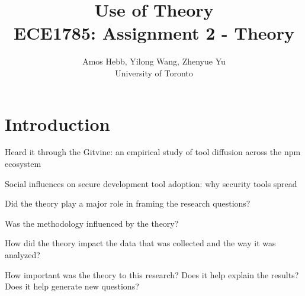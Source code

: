 \documentclass[12pt]{IEEEtran}
\begin{document}
\title{Use of Theory\\
{\normalsize ECE1785: Assignment 2 - Theory}}

\author{Amos Hebb, Yilong Wang, Zhenyue Yu\\ \small University of Toronto}

\maketitle

\section{Introduction}

Heard it through the {\sc Git}vine: an empirical study of tool diffusion across the npm ecosystem\cite{lamba2020heard}

Social influences on secure development tool adoption: why security tools spread\cite{xiao2014social}

Did the theory play a major role in framing the research questions?

Was the methodology influenced by the theory?

How did the theory impact the data that was collected and the way it was analyzed?

How important was the theory to this research? Does it help explain the results? Does it help generate new questions?



\end{document}
